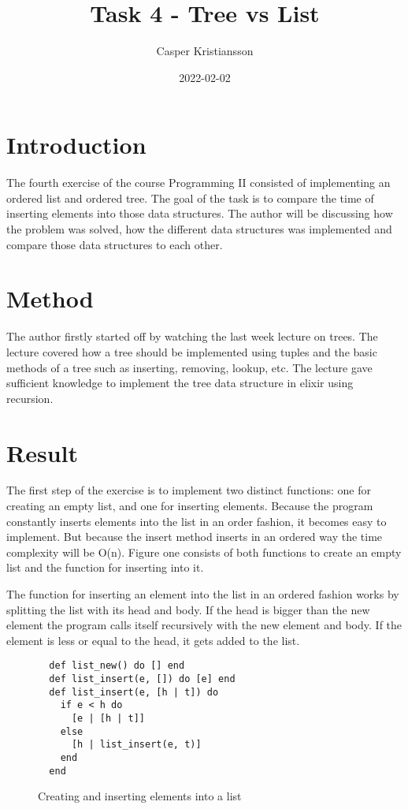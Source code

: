\documentclass[a4paper,11pt]{article}
\begin{document}
\title{
    \textbf{Task 4 - Tree vs List}
}
\author{Casper Kristiansson}
\date{2022-02-02}

\maketitle

\section*{Introduction}
The fourth exercise of the course Programming II consisted of implementing an ordered list and ordered tree. The goal of the task is to compare the time of inserting elements into those data structures. The author will be discussing how the problem was solved, how the different data structures was implemented and compare those data structures to each other.

\section*{Method}
The author firstly started off by watching the last week lecture on trees. The lecture covered how a tree should be implemented using tuples and the basic methods of a tree such as inserting, removing, lookup, etc. The lecture gave sufficient knowledge to implement the tree data structure in elixir using recursion.

\section*{Result}
The first step of the exercise is to implement two distinct functions: one for creating an empty list, and one for inserting elements. Because the program constantly inserts elements into the list in an order fashion, it becomes easy to implement. But because the insert method inserts in an ordered way the time complexity will be O(n). Figure one consists of both functions to create an empty list and the function for inserting into it.

The function for inserting an element into the list in an ordered fashion works by splitting the list with its head and body. If the head is bigger than the new element the program calls itself recursively with the new element and body. If the element is less or equal to the head, it gets added to the list.


\begin{figure}[H]
\begin{verbatim}
  def list_new() do [] end
  def list_insert(e, []) do [e] end
  def list_insert(e, [h | t]) do
    if e < h do
      [e | [h | t]]
    else
      [h | list_insert(e, t)]
    end
  end
\end{verbatim}
\caption{Creating and inserting elements into a list}
\label{Figure:1}
\end{figure}
\end{document}

